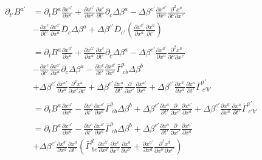 \documentclass{article}
\begin{document}
\begin{align*}
\partial_{t'}B^{a'} & = \partial_{t}B^{a}\frac{\partial x^{a'}}{\partial x^{a}}  + \frac{\partial x^{a'}}{\partial x^{a}}\frac{\partial x^{c}}{\partial t'}\partial_{c}\Delta \beta^{a} - \Delta \beta^{c'}\frac{\partial x^{a'}}{\partial x^{a}}\frac{\partial^2 x^{a}}{\partial t' \partial x^{c'}}\\
& - \frac{\partial x^{c}}{\partial t'}\frac{\partial x^{a'}}{\partial x^{a}}{\bar D}_{c}\Delta \beta^{a} +  \Delta \beta^{c'}{\bar D}_{c'}(\frac{\partial x^{a'}}{\partial x^{a}}\frac{\partial x^{a}}{\partial t'})\\
\\
& = \partial_{t}B^{a}\frac{\partial x^{a'}}{\partial x^{a}} + \frac{\partial x^{a'}}{\partial x^{a}}\frac{\partial x^{c}}{\partial t'}\partial_{c}\Delta \beta^{a} - \Delta \beta^{c'}\frac{\partial x^{a'}}{\partial x^{a}}\frac{\partial^2 x^{a}}{\partial t' \partial x^{c'}}\\
& - \frac{\partial x^{c}}{\partial t'}\frac{\partial x^{a'}}{\partial x^{a}}\partial_{c}\Delta \beta^{a} - \frac{\partial x^{c}}{\partial t'}\frac{\partial x^{a'}}{\partial x^{a}}{\bar \Gamma}^{a}_{~cb}\Delta \beta^{b}\\
& + \Delta \beta^{c'}\frac{\partial x^{a'}}{\partial x^{a}}\frac{\partial^2 x^{a}}{\partial x^{c'}\partial t'} + \Delta \beta^{c'}\frac{\partial x^{a}}{\partial t'}\frac{\partial}{\partial x^{c'}}\frac{\partial  x^{a'}}{\partial x^{a}} + \Delta \beta^{c'}\frac{\partial x^{b'}}{\partial x^{a}}\frac{\partial x^{a}}{\partial t'}{\bar \Gamma}^{a'}_{~c'b'}\\
\\
& = \partial_{t}B^{a}\frac{\partial x^{a'}}{\partial x^{a}} - \frac{\partial x^{c}}{\partial t'}\frac{\partial x^{a'}}{\partial x^{a}}{\bar \Gamma}^{a}_{~cb}\Delta \beta^{b} + \Delta \beta^{c'}\frac{\partial x^{a}}{\partial t'}\frac{\partial}{\partial x^{c'}}\frac{\partial  x^{a'}}{\partial x^{a}} + \Delta \beta^{c'}\frac{\partial x^{b'}}{\partial x^{a}}\frac{\partial x^{a}}{\partial t'}{\bar \Gamma}^{a'}_{~c'b'}\\
\\
& = \partial_{t}B^{a}\frac{\partial x^{a'}}{\partial x^{a}} - \frac{\partial x^{c}}{\partial t'}\frac{\partial x^{a'}}{\partial x^{a}}{\bar \Gamma}^{a}_{~cb}\Delta \beta^{b} + \Delta \beta^{c'}\frac{\partial x^{a}}{\partial t'}\frac{\partial}{\partial x^{c'}}\frac{\partial  x^{a'}}{\partial x^{a}} \\
& + \Delta \beta^{c'}\frac{\partial x^{b'}}{\partial x^{a}}\frac{\partial x^{a}}{\partial t'}({\bar \Gamma}^{d}_{~bc}\frac{\partial x^{a'}}{\partial x^{d}}\frac{\partial x^{c}}{\partial x^{c'}}\frac{\partial x^{b}}{\partial x^{b'}} + \frac{\partial x^{a'}}{\partial x^{d}}\frac{\partial^2 x^{d}}{\partial x^{b'}\partial x^{c'}})\\

\end{align*}
\end{document}
